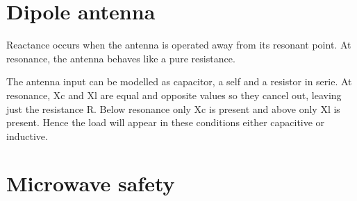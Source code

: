 \section{Dipole antenna}
Reactance occurs when the antenna is operated away from its resonant point. At resonance, the antenna behaves like a pure resistance. 

The antenna input can be modelled as capacitor, a self and a resistor in serie. At resonance, Xc and Xl are equal and opposite values so they cancel out, leaving just the resistance R. Below resonance only Xc is present and above only Xl is present. Hence the load will appear in these conditions either capacitive or inductive. 

 
\section{Microwave safety}
\parencite[sec.5.8.3]{Benford2015}


